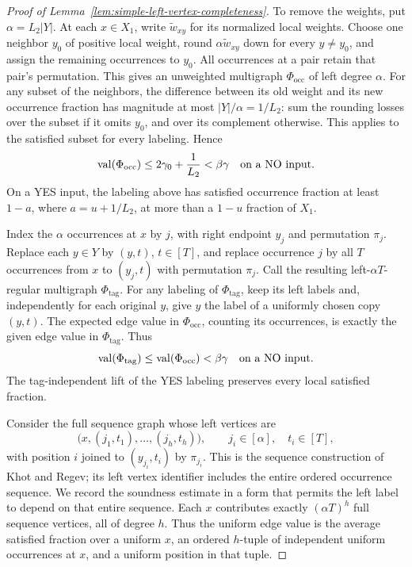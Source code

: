 \begin{proof}[Proof of Lemma~\ref{lem:simple-left-vertex-completeness}]
To remove the weights, put \(\alpha=L_2|Y|\).  At each \(x\in X_1\),
write \(\widetilde w_{xy}\) for its normalized local weights.
Choose one neighbor \(y_0\) of positive local weight, round
\(\alpha\widetilde w_{xy}\) down for every \(y\ne y_0\), and assign the remaining
occurrences to \(y_0\).  All occurrences at a pair retain that pair's
permutation.  This gives an unweighted multigraph
\(\Phi_{\mathrm{occ}}\) of left degree \(\alpha\).  For any subset of
the neighbors, the difference between
its old weight and its new occurrence fraction has magnitude at most
\(|Y|/\alpha=1/L_2\): sum the rounding losses over the subset if it
omits \(y_0\), and over its complement otherwise.  This applies to the
satisfied subset for every labeling.  Hence
\begin{equation}
 \operatorname{val}(\Phi_{\mathrm{occ}})\le 2\gamma_0+\frac1{L_2}<\beta\gamma
 \quad\text{on a NO input}.
\label{eq:left-vertex-completeness-base-soundness}
\end{equation}
On a YES input, the labeling above has satisfied occurrence fraction
at least \(1-a\), where \(a=u+1/L_2\), at more than a \(1-u\) fraction
of \(X_1\).

Index the \(\alpha\) occurrences at \(x\) by \(j\), with right endpoint
\(y_j\) and permutation \(\pi_j\).  Replace each \(y\in Y\) by
\((y,t)\), \(t\in[T]\), and replace occurrence \(j\) by all \(T\)
occurrences from \(x\) to \((y_j,t)\) with permutation \(\pi_j\).
Call the resulting left-\(\alpha T\)-regular multigraph
\(\Phi_{\mathrm{tag}}\).  For any labeling of \(\Phi_{\mathrm{tag}}\),
keep its left labels and, independently for each original \(y\), give
\(y\) the label of a uniformly chosen copy \((y,t)\).  The expected
edge value in \(\Phi_{\mathrm{occ}}\), counting its occurrences, is
exactly the given edge value in \(\Phi_{\mathrm{tag}}\).  Thus
\begin{equation}
 \operatorname{val}(\Phi_{\mathrm{tag}})\le\operatorname{val}(\Phi_{\mathrm{occ}})<\beta\gamma
 \quad\text{on a NO input}.
\label{eq:left-vertex-completeness-tag-value}
\end{equation}
The tag-independent lift of the YES labeling preserves every local
satisfied fraction.

Consider the full sequence graph whose left vertices are
\[
 \bigl(x,(j_1,t_1),\ldots,(j_h,t_h)\bigr),
 \qquad j_i\in[\alpha],\quad t_i\in[T],
\]
with position \(i\) joined to \((y_{j_i},t_i)\) by \(\pi_{j_i}\).
This is the sequence construction of Khot and Regev; its left vertex
identifier includes the entire ordered occurrence sequence.  We record
the soundness estimate in a form that permits the left label to depend
on that entire sequence.
Each \(x\) contributes exactly \((\alpha T)^h\) full sequence vertices,
all of degree \(h\).  Thus the uniform edge value is the average satisfied
fraction over a uniform \(x\), an ordered \(h\)-tuple of independent
uniform occurrences at \(x\), and a uniform position in that tuple.


\end{proof}
